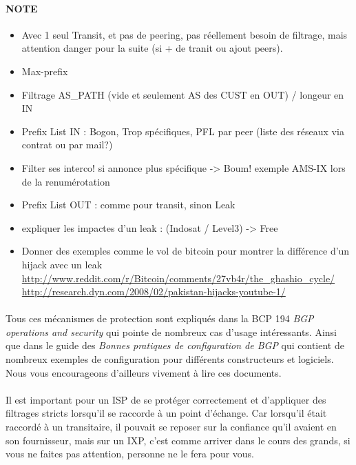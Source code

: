 \paragraph{NOTE}
\begin{itemize}
\item Avec 1 seul Transit, et pas de peering, pas réellement besoin de filtrage, mais attention danger pour la suite (si + de tranit ou ajout peers).
\item Max-prefix
\item Filtrage AS\_PATH (vide et seulement AS des CUST en OUT) / longeur en IN
\item Prefix List IN  : Bogon, Trop spécifiques, PFL par peer (liste des réseaux via contrat ou par mail?)
\item Filter ses interco! si annonce plus spécifique -> Boum! exemple AMS-IX lors de la renumérotation
\item Prefix List OUT : comme pour transit, sinon Leak
\item expliquer les impactes d'un leak :  (Indosat / Level3) -> Free
\item Donner des exemples comme le vol de bitcoin pour montrer la différence d'un hijack avec un leak
\url{http://www.reddit.com/r/Bitcoin/comments/27vb4r/the_ghashio_cycle/}
\url{http://research.dyn.com/2008/02/pakistan-hijacks-youtube-1/}
\end{itemize}

\paragraph{}
Tous ces mécanismes de protection sont expliqués dans la BCP 194 \emph{BGP operations and security} \cite{fenioux:BGPOPSEC} qui pointe de nombreux cas d'usage intéressants. Ainsi que dans le guide des \emph{Bonnes pratiques de configuration de BGP} \cite{fenioux:ANSSIBGP} qui contient de nombreux exemples de configuration pour différents constructeurs et logiciels. Nous vous encourageons d'ailleurs vivement à lire ces documents.

\paragraph{}
Il est important pour un ISP de se protéger correctement et d'appliquer des filtrages stricts lorsqu'il se raccorde à un point d'échange.
Car lorsqu'il était raccordé à un transitaire, il pouvait se reposer sur la confiance qu'il avaient en son fournisseur, mais sur un IXP, c'est comme arriver dans le cours des grands, si vous ne faites pas attention, personne ne le fera pour vous.

